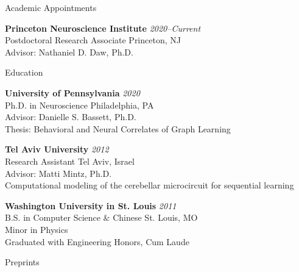 \documentclass{resume} %
\begin{document}

\begin{rSection}{Academic Appointments}

\textbf{Princeton Neuroscience Institute} \hfill \emph{2020--Current} \\
Postdoctoral Research Associate \hfill Princeton, NJ \\
Advisor: Nathaniel D. Daw, Ph.D.

\end{rSection}


\begin{rSection}{Education}

\textbf{University of Pennsylvania} \hfill \emph{2020} \\
Ph.D. in Neuroscience \hfill Philadelphia, PA \\
Advisor: Danielle S. Bassett, Ph.D. \\
Thesis: Behavioral and Neural Correlates of Graph Learning

\textbf{Tel Aviv University} \hfill \emph{2012} \\
Research Assistant \hfill Tel Aviv, Israel \\
Advisor: Matti Mintz, Ph.D. \\
Computational modeling of the cerebellar microcircuit for sequential learning

\textbf{Washington University in St. Louis} \hfill \emph{2011} \\
B.S. in Computer Science \& Chinese \hfill St. Louis, MO \\
Minor in Physics \\
Graduated with Engineering Honors, Cum Laude

\end{rSection}


\begin{rSection}{Preprints}
\nocite{*}
\printbibliography[heading=none, keyword=preprint]
\end{rSection}
\end{document}
